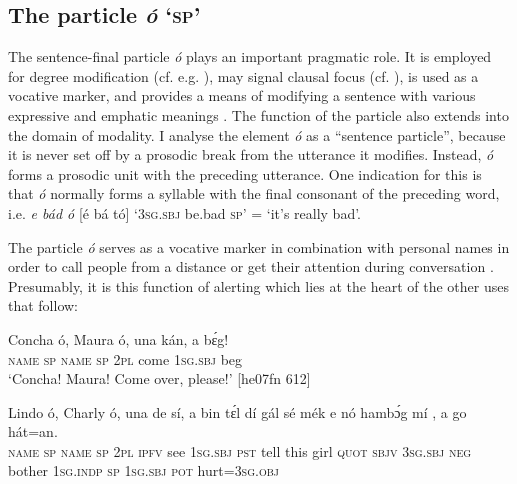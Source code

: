 \ea%
    \label{ex:key:1669}
\z\z

\subsection{The particle \textit{ó} ‘\textsc{sp’}}\label{sec:12.2.5}

The sentence-final particle \textit{ó} plays an important pragmatic role. It is employed for degree modification (cf. e.g. ), may signal clausal focus (cf. ), is used as a vocative marker, and provides a means of modifying a sentence with various expressive and emphatic meanings . The function of the particle also extends into the domain of modality. I analyse the element \textit{ó} as a “sentence particle”, because it is never set off by a prosodic break from the utterance it modifies. Instead, \textit{ó} forms a prosodic unit with the preceding utterance. One indication for this is that \textit{ó} normally forms a syllable with the final consonant of the preceding word, i.e. \textit{e bád ó} [é bá tó] ‘\textsc{3sg.sbj} be.bad \textsc{sp’} = ‘it’s really bad’.


The particle \textit{ó} serves as a vocative marker in combination with personal names in order to call people from a distance  or get their attention during conversation . Presumably, it is this function of alerting which lies at the heart of the other uses that follow: 



\ea%
    \label{ex:key:1670}
    \gll Concha  ó,  Maura  ó,  una  kán,    a    bɛ́g!\\
\textsc{name}  \textsc{sp}  \textsc{name}  \textsc{sp}  \textsc{2pl}  come  \textsc{1sg.sbj}  beg\\

\glt ‘Concha! Maura! Come over, please!’ [he07fn 612]
\z


\ea%
    \label{ex:key:1671}
    \gll Lindo  ó,  Charly  ó,  una  de  sí,  a    bin  tɛ́l  dí  gál  sé
mék  e    nó  hambɔ́g  mí    ,  a    go  hát=an.\\
\textsc{name}  \textsc{sp}  \textsc{name}  \textsc{sp}  \textsc{2pl}  \textsc{ipfv}  see  \textsc{1sg.sbj}  \textsc{pst}  tell  this  girl  \textsc{quot}
\textsc{sbjv}  \textsc{3sg.sbj}  \textsc{neg}  bother  \textsc{1sg.indp}  \textsc{sp}  \textsc{1sg.sbj}  \textsc{pot}  hurt=\textsc{3sg.obj}\\

